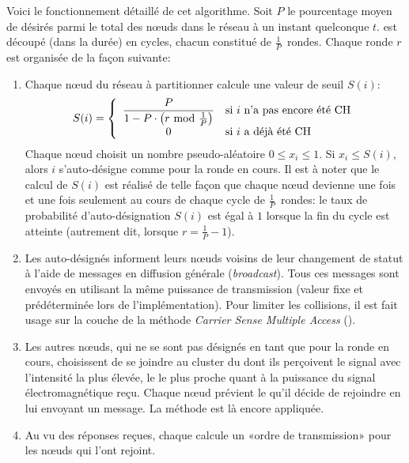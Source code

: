 Voici le fonctionnement détaillé de cet algorithme.
Soit $P$ le pourcentage moyen de \CHs désirés parmi le total des nœuds dans le réseau à un instant quelconque $t$.
\leach est découpé (dans la durée) en cycles, chacun constitué de $\frac{1}{P}$~rondes.
Chaque ronde $r$ est organisée de la façon suivante:
\begin{enumerate}
    \item Chaque nœud du réseau à partitionner calcule une valeur de seuil $S(i)$:
        \[
            S(i) = \left\{
            \begin{array}{cl}
                \displaystyle \frac{P}{1-P\cdot\left(r\mbox{ mod }\frac{1}{P}\right)} & \mbox{si }i\mbox{ n'a pas encore été \CH}\\
                                                                     0 & \mbox{si }i\mbox{ a déjà été \CH}
            \end{array}
            \right.
        \]
        Chaque nœud choisit un nombre pseudo-aléatoire $0 \le x_{i}\le 1$.
        Si $x_{i} \le S(i)$, alors $i$ s'auto-désigne comme \CH pour la ronde en cours.
        Il est à noter que le calcul de $S(i)$ est réalisé de telle façon que chaque nœud devienne \ch une fois et une fois seulement au cours de chaque cycle de $\frac{1}{P}$~rondes: le taux de probabilité d'auto-désignation $S(i)$ est égal à $1$ lorsque la fin du cycle est atteinte (autrement dit, lorsque $r = \frac{1}{P}-1$).
    \item Les \CHs auto-désignés informent leurs nœuds voisins de leur changement de statut à l'aide de messages en diffusion générale (\textit{broadcast}).
        Tous ces messages sont envoyés en utilisant la même puissance de transmission (valeur fixe et prédéterminée lors de l'implémentation).
        Pour limiter les collisions, il est fait usage sur la couche \mac de la méthode \textit{Carrier Sense Multiple Access} (\csma).
    \item Les autres nœuds, qui ne se sont pas désignés en tant que \chs pour la ronde en cours, choisissent de se joindre au cluster du \CH dont ils perçoivent le signal avec l'intensité la plus élevée, \cad le \CH le plus proche quant à la puissance du signal électromagnétique reçu.
        Chaque nœud prévient le \ch qu'il décide de rejoindre en lui envoyant un message.
        La méthode \csma est là encore appliquée.
    \item Au vu des réponses reçues, chaque \ch calcule un «ordre de transmission» pour les nœuds qui l'ont rejoint.

\end{enumerate}
